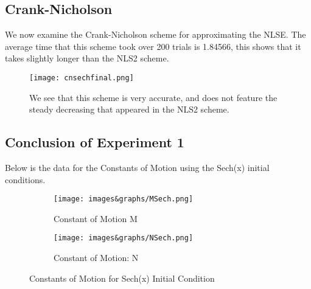 \documentclass[11pt, oneside]{article}   	%
\begin{document}
\subsection{Crank-Nicholson}
We now examine the Crank-Nicholson scheme for approximating the NLSE. The average time that this scheme took over 200 trials is 1.84566, this shows that it takes slightly longer than the NLS2 scheme.
\begin{figure}[H]
    \centering
    \texttt{[image: cnsechfinal.png]}
    \caption{We see that this scheme is very accurate, and does not feature the steady decreasing that appeared in the NLS2 scheme.}
    \label{fig:my_label}
\end{figure}

\subsection{Conclusion of Experiment 1}
Below is the data for the Constants of Motion using the Sech(x) initial conditions.

\begin{figure}[H]
    \begin{subfigure}{0.5\textwidth}
    \centering\captionsetup{width=.85\linewidth}
        \texttt{[image: images\&graphs/MSech.png]}
        \caption{Constant of Motion M}
        \label{nlsExp1M}
    \end{subfigure}%
    \begin{subfigure}{0.5\textwidth}
    \centering\captionsetup{width=.85\linewidth}
        \texttt{[image: images\&graphs/NSech.png]}
        \caption{Constant of Motion: N}
        \label{nlsExp1N}
    \end{subfigure}
\caption{Constants of Motion for Sech(x) Initial Condition}
\label{fig:image2}
\end{figure}
\end{document}
